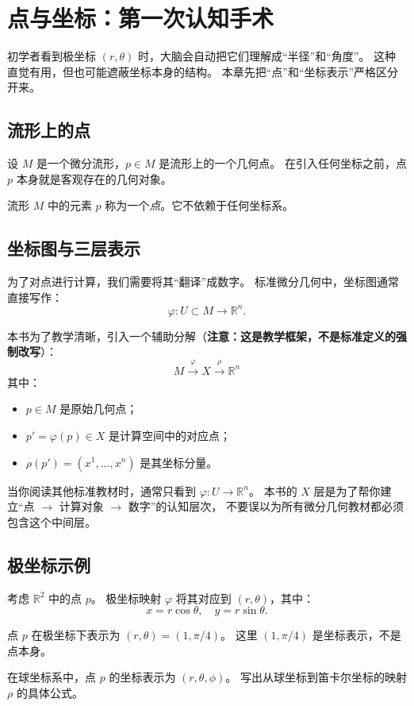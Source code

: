 
\chapter{点与坐标：第一次认知手术}

\begin{intuition}
	初学者看到极坐标 $(r,\theta)$ 时，大脑会自动把它们理解成“半径”和“角度”。
	这种直觉有用，但也可能遮蔽坐标本身的结构。
	本章先把“点”和“坐标表示”严格区分开来。
\end{intuition}

\section{流形上的点}

设 $M$ 是一个微分流形，$p \in M$ 是流形上的一个几何点。
在引入任何坐标之前，点 $p$ 本身就是客观存在的几何对象。

\begin{definition}[几何点]
	流形 $M$ 中的元素 $p$ 称为一个\emph{点}。它不依赖于任何坐标系。
\end{definition}

\section{坐标图与三层表示}

为了对点进行计算，我们需要将其“翻译”成数字。
标准微分几何中，坐标图通常直接写作：
\[
\varphi: U \subset M \to \mathbb{R}^n.
\]

本书为了教学清晰，引入一个辅助分解（\textbf{注意：这是教学框架，不是标准定义的强制改写}）：
\[
M \xrightarrow{\varphi} X \xrightarrow{\rho} \mathbb{R}^n
\]
其中：
\begin{itemize}
	\item $p \in M$ 是原始几何点；
	\item $p' = \varphi(p) \in X$ 是计算空间中的对应点；
	\item $\rho(p') = (x^1, \ldots, x^n)$ 是其坐标分量。
\end{itemize}

\begin{remark}
	当你阅读其他标准教材时，通常只看到 $\varphi: U \to \mathbb{R}^n$。
	本书的 $X$ 层是为了帮你建立“点 $\to$ 计算对象 $\to$ 数字”的认知层次，
	不要误以为所有微分几何教材都必须包含这个中间层。
\end{remark}

\section{极坐标示例}

考虑 $\mathbb{R}^2$ 中的点 $p$。
极坐标映射 $\varphi$ 将其对应到 $(r,\theta)$，其中：
\[
x = r\cos\theta,\quad y = r\sin\theta.
\]

\begin{example}
	点 $p$ 在极坐标下表示为 $(r,\theta) = (1, \pi/4)$。
	这里 $(1, \pi/4)$ 是坐标表示，不是点本身。
\end{example}

\begin{exercise}
	在球坐标系中，点 $p$ 的坐标表示为 $(r,\theta,\phi)$。
	写出从球坐标到笛卡尔坐标的映射 $\rho$ 的具体公式。
\end{exercise}